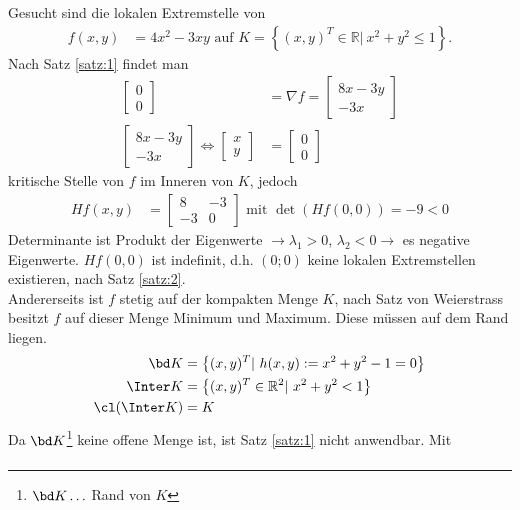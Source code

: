 \begin{exmp}
Gesucht sind die lokalen Extremstelle von 
\begin{align*}
	f(x,y) & = 4x^2-3xy \text{ auf } K=\left\{(x,y)^T\in\mathbb{R}|\ x^2+y^2\le 1 \right\}.
\end{align*}
Nach Satz \ref{satz:1} findet man 
\begin{align*}
	\begin{bmatrix}
	0\\0
	\end{bmatrix} & = \nabla f = \begin{bmatrix}
	8x-3y\\-3x
	\end{bmatrix}\\
	\begin{bmatrix}
	8x-3y\\-3x
	\end{bmatrix}\Leftrightarrow \begin{bmatrix}
	x\\y
	\end{bmatrix} & = \begin{bmatrix}
	0\\0
	\end{bmatrix}
\end{align*}
kritische Stelle von $f$ im Inneren von $K$, jedoch
\begin{align*}
		H f(x,y) & = \begin{bmatrix}
		8 & -3\\ -3 & 0
		\end{bmatrix} \text{ mit } \det\left(H f(0,0)\right) = -9 < 0
\end{align*}
Determinante ist Produkt der Eigenwerte $\rightarrow \lambda_1>0$, $\lambda_2<0\rightarrow$ es negative Eigenwerte. $H f(0,0)$ ist indefinit, d.h. $(0;0)$ keine lokalen Extremstellen
existieren, nach Satz \ref{satz:2}.\\ 
Andererseits ist $f$ stetig auf der kompakten Menge $K$, nach Satz von Weierstrass besitzt $f$ auf dieser Menge Minimum und Maximum. Diese müssen
auf dem Rand liegen.
\begin{align*}
	\bd K  & = \left\{(x,y)^T|\ h(x,y):=x^2+y^2-1=0\right\}\\
	\Inter K &=\left\{(x,y)^T\in\mathbb{R}^2|\ x^2+y^2<1 \right\}\\
	\cl(\Inter K) & = K
\end{align*}
Da $\bd K$\footnote{$\bd K\ldots$ Rand von $K$} keine offene Menge ist, ist Satz \ref{satz:1} nicht anwendbar. Mit
\begin{align*}

\end{align*}
\end{exmp}
